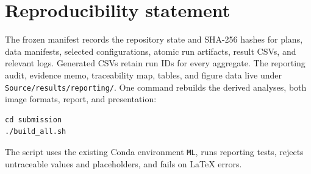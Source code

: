 \section{Reproducibility statement}

The frozen manifest records the repository state and SHA-256 hashes for plans, data manifests, selected configurations, atomic run artifacts, result CSVs, and relevant logs. Generated CSVs retain run IDs for every aggregate. The reporting audit, evidence memo, traceability map, tables, and figure data live under \texttt{Source/results/reporting/}. One command rebuilds the derived analyses, both image formats, report, and presentation:
\begin{verbatim}
cd submission
./build_all.sh
\end{verbatim}
The script uses the existing Conda environment \texttt{ML}, runs reporting tests, rejects untraceable values and placeholders, and fails on LaTeX errors.
